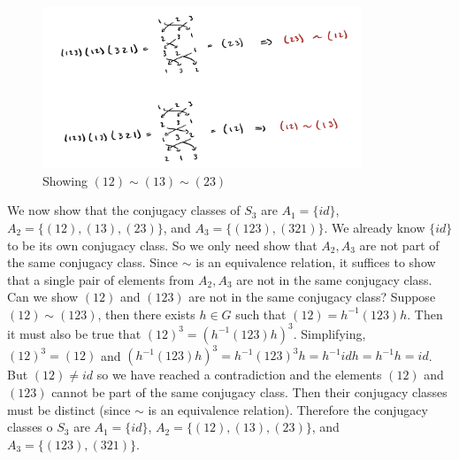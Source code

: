 \documentclass[11pt]{article}
\begin{document}
\begin{exercise}{65}{19}
{        \begin{figure}[h]
            \centering
            \includegraphics[width=0.85\textwidth]{img/12eq}
            \caption{Showing $(12) \sim (13) \sim (23)$}
            \label{fig:12eq}
        \end{figure}

        \newpage
        We now show that the conjugacy classes of $S_3$ are $A_1 = \{ id \}$, $A_2 = \{ (12), (13), (23) \}$, and $A_3 = \{ (123), (321) \}$.
        We already know $\{ id \}$ to be its own conjugacy class.
        So we only need show that $A_2, A_3$ are not part of the same conjugacy class.
        Since $\sim$ is an equivalence relation, it suffices to show that a single pair of elements from $A_2, A_3$ are not in the same conjugacy class.
        Can we show $(12)$ and $(123)$ are not in the same conjugacy class?
        Suppose $(12) \sim (123)$, then there exists $h \in G$ such that $(12) = h^{-1} (123) h$.
        Then it must also be true that $(12)^3 = (h^{-1} (123) h)^3$.
        Simplifying, $(12)^3 = (12)$ and $(h^{-1} (123) h)^3 = h^{-1} (123)^3 h = h^{-1} id h = h^{-1} h = id$.
        But $(12) \neq id$ so we have reached a contradiction and the elements $(12)$ and $(123)$ cannot be part of the same conjugacy class.
        Then their conjugacy classes must be distinct (since $\sim$ is an equivalence relation).
        Therefore the conjugacy classes o $S_3$ are $A_1 = \{ id \}$, $A_2 = \{ (12), (13), (23) \}$, and $A_3 = \{ (123), (321) \}$.
    }
\end{exercise}


\begin{exercise}{65}{21}
    \proof{
    }
\end{exercise}
\end{document}
